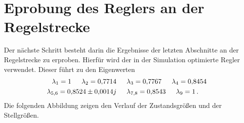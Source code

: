 \section{Eprobung des Reglers an der Regelstrecke}
Der nächste Schritt besteht darin die Ergebnisse der letzten Abschnitte an der Regelstrecke zu erproben. Hierfür wird der in der Simulation optimierte Regler verwendet. Dieser führt zu den Eigenwerten
\begin{equation}
\begin{split}
\lambda_{\text{1}} = 1 \hspace{15pt} \lambda_{\text{2}} = 0{,}7714 \hspace{15pt} &\lambda_{\text{3}} = 0{,}7767 \hspace{15pt} \lambda_{\text{4}} = 0{,}8454
\\
\lambda_{\text{5,6}} = 0{,}8524\pm0{,}0014j \hspace{15pt} &\lambda_{\text{7,8}} = 0{,}8543 \hspace{15pt} \lambda_{\text{9}} = 1 \,.
\end{split}
\label{eq_ew1_corner}
\end{equation}
Die folgenden Abbildung zeigen den Verlauf der Zustandsgrößen und der Stellgrößen.
